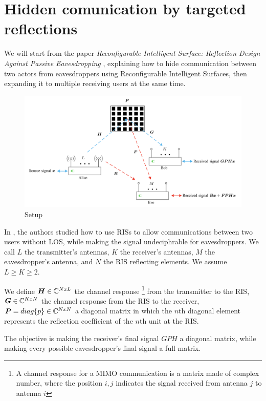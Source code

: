 \section{Hidden comunication by targeted reflections}

We will start from the paper \textit{Reconfigurable Intelligent Surface: Reflection Design Against Passive Eavesdropping} \cite{9328149}, explaining how to hide communication between two actors from eavesdroppers using Reconfigurable Intelligent Surfaces, then expanding it to multiple receiving users at the same time.

\begin{figure}[H]
  \centering
  \includegraphics[width=\linewidth]{imgs/problem-description.png}
  \caption{Setup}
  \label{fig:correlation_sk}
\end{figure}

In \cite{9328149}, the authors studied how to use RISs to allow communications between two users without LOS, while making the signal undeciphrable for eavesdroppers. We call $L$ the transmitter's antennas, $K$ the receiver's antennas, $M$ the eavesdropper's antenna, and $N$ the RIS reflecting elements. We assume $L \ge K \ge 2$.

We define $\bm{H} \in \mathbb{C}^{NxL}$ the channel response \footnote{A channel response for a MIMO communication is a matrix made of complex number, where the position $i,j$ indicates the signal received from antenna $j$ to antenna $i$} from the transmitter to the RIS, $\bm{G} \in \mathbb{C}^{KxN}$ the channel response from the RIS to the receiver, $\bm{P} = diag\{p\} \in \mathbb{C}^{NxN}$ a diagonal matrix in which the $n$th diagonal element represents the reﬂection coefﬁcient of the $n$th unit at the RIS.

The objective is making the receiver's final signal $GPH$ a diagonal matrix, while making every possible eavesdropper's final signal a full matrix.

